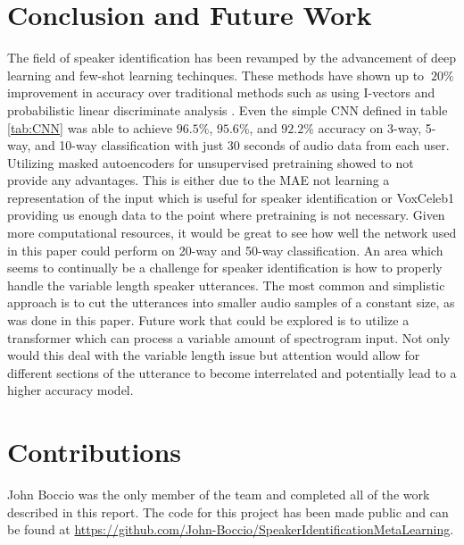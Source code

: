 \documentclass{article}
\begin{document}
\section{Conclusion and Future Work}
The field of speaker identification has been revamped by the advancement of deep learning and few-shot learning techinques.
These methods have shown up to $~20\%$ improvement in accuracy over traditional methods such as using I-vectors and probabilistic 
linear discriminate analysis \cite{ivectorPLDA}. Even the simple CNN defined in table \ref{tab:CNN} was able to achieve
$96.5\%$, $95.6\%$, and $92.2\%$ accuracy on 3-way, 5-way, and 10-way classification with just 30 seconds of audio data
from each user. Utilizing masked autoencoders for unsupervised pretraining showed to not provide any advantages. This is either
due to the MAE not learning a representation of the input which is useful for speaker identification or VoxCeleb1 providing us
enough data to the point where pretraining is not necessary. Given more computational resources, it would be great to see 
how well the network used in this paper could perform on 20-way and 50-way classification. An area which seems to continually
be a challenge for speaker identification is how to properly handle the variable length speaker utterances. The most common
and simplistic approach is to cut the utterances into smaller audio samples of a constant size, as was done in this paper.
Future work that could be explored is to utilize a transformer which can process a variable amount of spectrogram input.
Not only would this deal with the variable length issue but attention would allow for different sections of the utterance
to become interrelated and potentially lead to a higher accuracy model.

\section{Contributions}
John Boccio was the only member of the team and completed all of the work described in this report. The code for this 
project has been made public and can be found at 
\href{https://github.com/John-Boccio/SpeakerIdentificationMetaLearning}{https://github.com/John-Boccio/SpeakerIdentificationMetaLearning}.
\end{document}

